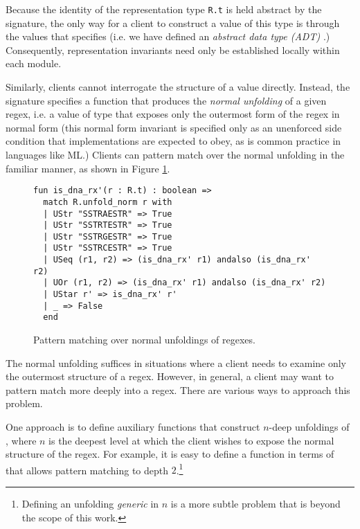 Because the identity of the representation type \lstinline{R.t} is held abstract by the signature, the only way for a client to construct a value of this type is through the values that  specifies (i.e. we have defined an \emph{abstract data type (ADT)}  \cite{liskov1974programming}.) Consequently, representation invariants need only be established locally within each module.




Similarly, clients cannot interrogate the structure of a value  directly. Instead, the signature specifies a function  that produces the \emph{normal unfolding} of a given regex, i.e. a value of type  that exposes only the outermost form of the regex in normal form (this normal form invariant is specified only as an unenforced side condition that implementations are expected to obey, as is common practice in languages like ML.) Clients can pattern match over the {normal unfolding} in the familiar manner, as shown in Figure \ref{fig:is_dna_rx_prime}. 
\begin{figure}[h]
\begin{lstlisting}[numbers=none]
fun is_dna_rx'(r : R.t) : boolean => 
  match R.unfold_norm r with 
  | UStr "SSTRAESTR" => True
  | UStr "SSTRTESTR" => True
  | UStr "SSTRGESTR" => True
  | UStr "SSTRCESTR" => True
  | USeq (r1, r2) => (is_dna_rx' r1) andalso (is_dna_rx' r2)
  | UOr (r1, r2) => (is_dna_rx' r1) andalso (is_dna_rx' r2)
  | UStar r' => is_dna_rx' r'
  | _ => False
  end
\end{lstlisting}
\vspace{-5px}
\caption{Pattern matching over normal unfoldings of regexes.}
\label{fig:is_dna_rx_prime}
\end{figure}

The normal unfolding suffices in situations where a client needs to examine only the outermost structure of a regex. However, in general, a client may want to pattern match more deeply into a regex. There are various ways to approach this problem. 

One approach is to define auxiliary functions that construct $n$-deep unfoldings of , where $n$ is the deepest level at which the client wishes to expose the normal structure of the regex. For example, it is easy to define a function  in terms of  that allows pattern matching to depth $2$.\footnote{Defining an unfolding \emph{generic} in $n$ is a more subtle problem that is beyond the scope of this work.} 


